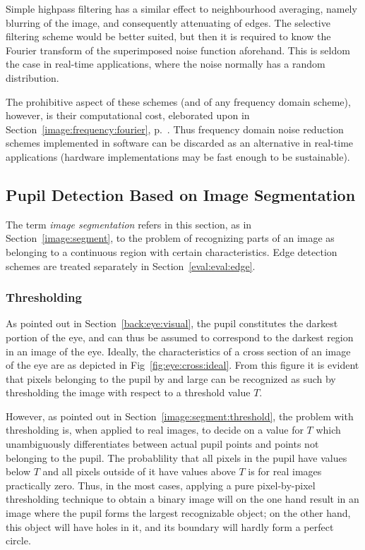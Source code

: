 Simple highpass filtering has a similar effect to neighbourhood
averaging, namely blurring of the image, and consequently attenuating
of edges.  The selective filtering scheme would be better suited, but
then it is required to know the Fourier transform of the superimposed
noise function aforehand.  This is seldom the case in real-time
applications, where the noise normally has a random distribution.

The prohibitive aspect of these schemes (and of any frequency domain
scheme), however, is their computational cost, eleborated upon in
Section~\ref{image:frequency:fourier}, p.~\pageref{pg:fft:O}.  Thus
frequency domain noise reduction schemes implemented in software can
be discarded as an alternative in real-time applications (hardware
implementations may be fast enough to be sustainable).

\subsection{Pupil Detection Based on Image Segmentation}
\label{eval:eval:segment}

The term {\em image segmentation\/} refers in this section, as in
Section~\ref{image:segment}, to the problem of recognizing parts of an
image as belonging to a continuous region with certain
characteristics.  Edge detection schemes are treated separately in
Section~\ref{eval:eval:edge}.

\subsubsection{Thresholding}

As pointed out in Section~\ref{back:eye:visual}, the pupil constitutes
the darkest portion of the eye, and can thus be assumed to correspond
to the darkest region in an image of the eye.  Ideally, the
characteristics of a cross section of an image of the eye are as
depicted in Fig~\ref{fig:eye:cross:ideal}.  From this figure it is
evident that pixels belonging to the pupil by and large can be
recognized as such by thresholding the image with respect to a
threshold value $T$.


However, as pointed out in Section~\ref{image:segment:threshold}, the
problem with thresholding is, when applied to real images, to decide
on a value for $T$ which unambiguously differentiates between actual
pupil points and points not belonging to the pupil.  The probablility
that all pixels in the pupil have values below $T$ and all pixels
outside of it have values above $T$ is for real images practically
zero.  Thus, in the most cases, applying a pure pixel-by-pixel
thresholding technique to obtain a binary image will on the one hand
result in an image where the pupil forms the largest recognizable
object; on the other hand, this object will have holes in it, and its
boundary will hardly form a perfect circle.

